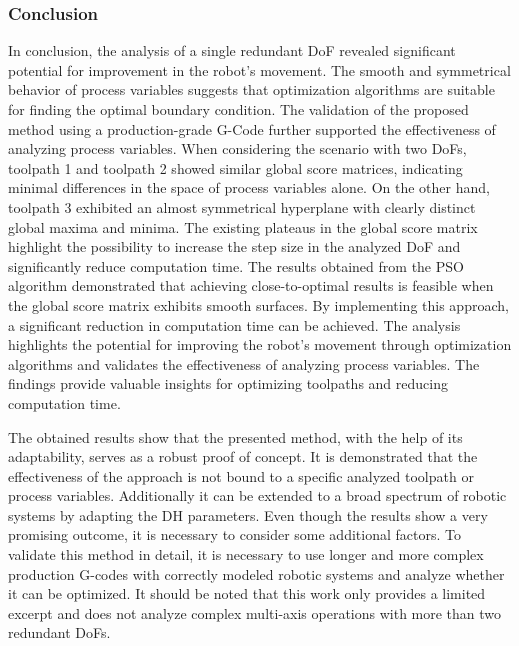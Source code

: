 \subsubsection{Conclusion}
In conclusion, the analysis of a single redundant \acrshort{DoF} revealed significant potential for improvement in the robot's movement. The smooth and symmetrical behavior of process variables suggests that optimization algorithms are suitable for finding the optimal boundary condition. The validation of the proposed method using a production-grade G-Code further supported the effectiveness of analyzing process variables.
When considering the scenario with two \acrshort{DoF}s, toolpath 1 and toolpath 2 showed similar global score matrices, indicating minimal differences in the space of process variables alone. On the other hand, toolpath 3 exhibited an almost symmetrical hyperplane with clearly distinct global maxima and minima.
The existing plateaus in the global score matrix highlight the possibility to increase the step size in the analyzed \acrshort{DoF} and significantly reduce computation time. 
The results obtained from the \acrshort{PSO} algorithm demonstrated that achieving close-to-optimal results is feasible when the global score matrix exhibits smooth surfaces. By implementing this approach, a significant reduction in computation time can be achieved.
The analysis highlights the potential for improving the robot's movement through optimization algorithms and validates the effectiveness of analyzing process variables. The findings provide valuable insights for optimizing toolpaths and reducing computation time.

The obtained results show that the presented method, with the help of its adaptability, serves as a robust proof of concept. It is demonstrated that the effectiveness of the approach is not bound to a specific analyzed toolpath or process variables. Additionally it can be extended to a broad spectrum of robotic systems by adapting the \acrshort{DH} parameters. Even though the results show a very promising outcome, it is necessary to consider some additional factors. To validate this method in detail, it is necessary to use longer and more complex production G-codes with correctly modeled robotic systems and analyze whether it can be optimized. It should be noted that this work only provides a limited excerpt and does not analyze complex multi-axis operations with more than two redundant \acrshort{DoF}s.





